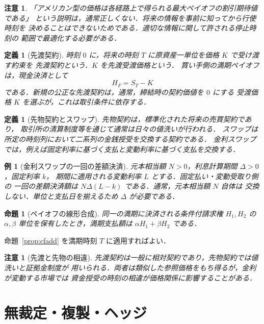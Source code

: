 \documentclass[a5paper,10pt,onecolumn]{jsarticle}
\makeatletter
\theoremstyle{mathnotetheorem}
\newtheorem{definition}[theorem]{定義}
\newtheorem{proposition}[theorem]{命題}
\newtheorem{example}[theorem]{例}
\newtheorem{remark}[theorem]{注意}
\renewcommand{\proofname}{証明}
\renewenvironment{proof}[1][\proofname]{%
  \par\pushQED{\qed}\normalfont\topsep4\p@\@plus2\p@\relax
  \trivlist\item[\hskip\labelsep\bfseries #1]\ignorespaces
}{\popQED\endtrivlist\@endpefalse}
\makeatother
\begin{document}
\begin{remark}
「アメリカン型の価格は各経路上で得られる最大ペイオフの割引期待値である」
という説明は，通常正しくない．将来の情報を事前に知ってから行使時刻を
決めることはできないためである．適切な情報に関して許される停止時刻の
範囲で最適化する必要がある．
\end{remark}

\begin{definition}[先渡契約]
時刻 $0$ に，将来の時刻 $T$ に原資産一単位を価格 $K$ で受け渡す約束を
\emph{先渡契約}という．$K$ を\emph{先渡受渡価格}という．
買い手側の満期ペイオフは，現金決済として
\[
 H_F=S_T-K
\]
である．新規の公正な先渡契約は，通常，締結時の契約価値を $0$ にする
受渡価格 $K$ を選ぶが，これは取引条件に依存する．
\end{definition}

\begin{definition}[先物契約とスワップ]
\emph{先物契約}は，標準化された将来の売買契約であり，
取引所の清算制度等を通じて通常は日々の値洗いが行われる．
\emph{スワップ}は所定の時刻列において二系列の金銭授受を交換する契約である．
金利スワップでは，例えば固定利率に基づく支払と変動利率に基づく支払を交換する．
\end{definition}

\begin{example}[金利スワップの一回の差額決済]
元本相当額 $N>0$，利息計算期間 $\Delta>0$，固定利率 $k$，
期間に適用される変動利率 $L$ とする．固定払い・変動受取り側の
一回の差額決済額は $N\Delta(L-k)$ である．通常，元本相当額 $N$ 自体は
交換しない．単位と支払日を揃えるため $\Delta$ が必要である．
\end{example}

\begin{proposition}[ペイオフの線形合成]
同一の満期に決済される条件付請求権 $H_1,H_2$ の
$\alpha,\beta$ 単位を保有したとき，満期支払額は
$\alpha H_1+\beta H_2$ である．
\end{proposition}
\begin{proof}
命題~\ref{prop:cfadd} を満期時刻 $T$ に適用すればよい．
\end{proof}

\begin{remark}[先渡と先物の相違]
先渡契約は一般に相対契約であり，先物契約では値洗いと証拠金制度が
用いられる．両者は類似した参照価格をもち得るが，金利が変動する市場では
資金授受の時刻の相違が価格関係に影響することがある．
\end{remark}

\section{無裁定・複製・ヘッジ}
\end{document}
